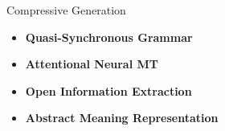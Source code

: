 \documentclass[xcolor={table}]{beamer}
\begin{document}
\begin{frame}{Compressive Generation}

    \begin{itemize}
      \item \textbf{Quasi-Synchronous Grammar} 
       {\scriptsize \citep{woodsend2010generation}}
      \item \textbf{Attentional Neural MT}
       {\scriptsize \citep{rush2015neural}}
    \end{itemize}

    \begin{itemize}
      \item \textbf{Open Information Extraction} 
       {\scriptsize \citep{pighin2014modelling}}
      \item \textbf{Abstract Meaning Representation} 
       {\scriptsize \citep{liu2015toward}}
    \end{itemize}

\end{frame}
 
\end{document}
